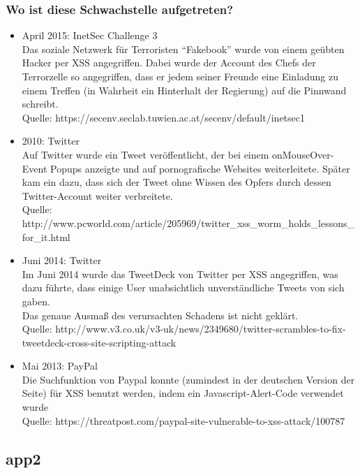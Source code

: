 \documentclass[12pt,a4paper,titlepage,oneside]{scrartcl}
\begin{document}
\subsubsection{Wo ist diese Schwachstelle aufgetreten?}

\begin{itemize}
	\item April 2015: InetSec Challenge 3
	\\Das soziale Netzwerk für Terroristen ``Fakebook'' wurde von einem geübten Hacker per XSS angegriffen. Dabei wurde der Account des Chefs der Terrorzelle so angegriffen, dass er jedem seiner Freunde eine Einladung zu einem Treffen (in Wahrheit ein Hinterhalt der Regierung) auf die Pinnwand schreibt.
	\\Quelle: https://secenv.seclab.tuwien.ac.at/secenv/default/inetsec1
	
	\item 2010: Twitter
	\\ Auf Twitter wurde ein Tweet veröffentlicht, der bei einem onMouseOver-Event Popups anzeigte und auf pornografische Websites weiterleitete. Später kam ein dazu, dass sich der Tweet ohne Wissen des Opfers durch dessen Twitter-Account weiter verbreitete.
	\\ Quelle: http://www.pcworld.com/article/205969/twitter\_xss\_worm\_holds\_lessons\_for\_it.html
	
	\item Juni 2014: Twitter
	\\Im Juni 2014 wurde das TweetDeck von Twitter per XSS angegriffen, was dazu führte, dass einige User unabsichtlich unverständliche Tweets von sich gaben.
	\\Das genaue Ausmaß des verursachten Schadens ist nicht geklärt.
	\\ Quelle: http://www.v3.co.uk/v3-uk/news/2349680/twitter-scrambles-to-fix-tweetdeck-cross-site-scripting-attack
	
	\item Mai 2013: PayPal
	\\Die Suchfunktion von Paypal konnte (zumindest in der deutschen Version der Seite) für XSS benutzt werden, indem ein Javascript-Alert-Code verwendet wurde
	\\ Quelle: https://threatpost.com/paypal-site-vulnerable-to-xss-attack/100787
\end{itemize}


\subsection{app2}
\end{document}
